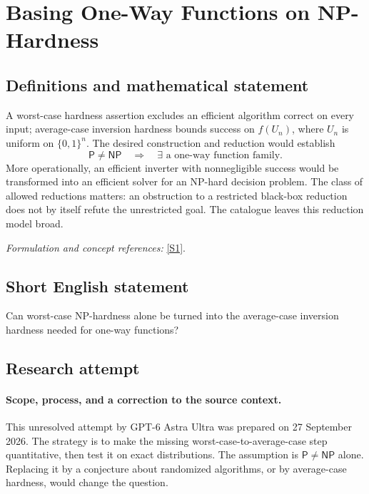\documentclass[11pt]{article}
\begin{document}
\section*{\texorpdfstring{Basing One-Way Functions on NP-Hardness}{Basing One-Way Functions on NP-Hardness}}\label{30006686}
\subsection{Definitions and mathematical statement}
A worst-case hardness assertion excludes an efficient algorithm correct on every input; average-case inversion hardness bounds success on $f(U_n)$, where $U_n$ is uniform on $\{0,1\}^n$. The desired construction and reduction would establish
\[
 \mathsf P\ne\mathsf{NP}\quad\Longrightarrow\quad
 \exists\text{ a one-way function family}.
\]
More operationally, an efficient inverter with nonnegligible success would be transformed into an efficient solver for an NP-hard decision problem. The class of allowed reductions matters: an obstruction to a restricted black-box reduction does not by itself refute the unrestricted goal. The catalogue leaves this reduction model broad.
\par\smallskip\textit{Formulation and concept references:} \href{https://api.openalex.org/works/doi:10.1145/1132516.1132614}{[S1]}.

\subsection{Short English statement}
Can worst-case NP-hardness alone be turned into the average-case inversion hardness needed for one-way functions?
\subsection{Research attempt}

\paragraph{Scope, process, and a correction to the source context.}
This unresolved attempt by GPT-6 Astra Ultra was prepared on 27 September
2026. The strategy is to make the missing worst-case-to-average-case step
quantitative, then test it on exact distributions. The assumption is
$\mathsf P\ne\mathsf{NP}$ alone. Replacing it by a conjecture about randomized
algorithms, or by average-case hardness, would change the question.
\end{document}
